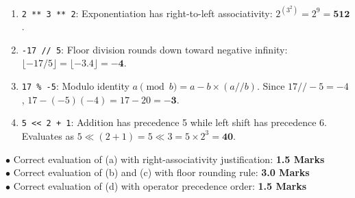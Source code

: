 \begin{solutionbox}
\begin{enumerate}[label=(\alph*), leftmargin=1.5em]
    \item \texttt{2 ** 3 ** 2}: Exponentiation has right-to-left associativity: $2^{(3^2)} = 2^9 = \mathbf{512}$.
    \item \texttt{-17 // 5}: Floor division rounds down toward negative infinity: $\lfloor -17/5 \rfloor = \lfloor -3.4 \rfloor = \mathbf{-4}$.
    \item \texttt{17 \% -5}: Modulo identity $a \pmod b = a - b \times (a // b)$. Since $17 // -5 = -4$, $17 - (-5)(-4) = 17 - 20 = \mathbf{-3}$.
    \item \texttt{5 << 2 + 1}: Addition has precedence 5 while left shift has precedence 6. Evaluates as $5 \ll (2 + 1) = 5 \ll 3 = 5 \times 2^3 = \mathbf{40}$.
\end{enumerate}
\begin{markingrubric}
$\bullet$ Correct evaluation of (a) with right-associativity justification: \textbf{1.5 Marks}\\
$\bullet$ Correct evaluation of (b) and (c) with floor rounding rule: \textbf{3.0 Marks}\\
$\bullet$ Correct evaluation of (d) with operator precedence order: \textbf{1.5 Marks}
\end{markingrubric}
\end{solutionbox}


